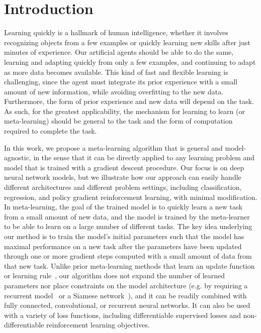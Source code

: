 \documentclass{article}
\begin{document}
\section{Introduction}
\label{sec:intro}


Learning quickly is a hallmark of human intelligence, whether it involves recognizing objects from a few examples or quickly learning new skills
after just minutes of experience. Our artificial agents should be able to do the same, learning and adapting quickly from only a few examples, and continuing to adapt as more data becomes available. This kind of fast and flexible learning is challenging, since the agent must integrate its prior experience with a small amount of new information, while avoiding overfitting to the new data. Furthermore, the form of prior experience and new data will depend on the task. As such, for the greatest applicability, the mechanism for learning to learn (or meta-learning) should be general to the task and the form of computation required to complete the task.

In this work, we propose a meta-learning algorithm that is general and model-agnostic, in the sense that it can be directly applied to any learning problem and model that is trained with a gradient descent procedure. Our focus is on deep neural network models, but we illustrate how our approach can easily handle different architectures and different problem settings, including classification, regression, and policy gradient reinforcement learning, with minimal modification.
In meta-learning, the goal of the trained model is to quickly learn a new task from a small amount of new data, and the model is
trained by the meta-learner to be able to learn on a large number of different tasks.
The key idea underlying our method is to
train the model's initial parameters such that the model has maximal performance on a new task after the parameters have been updated
through one or more gradient steps computed with a small amount of data from that new task.
Unlike prior meta-learning methods that learn an update function or learning rule~\cite{schmidhuber1987,bengiobengio1,learntolearnbygdbygd,hugo}, our algorithm does not expand the number of learned parameters nor place constraints on the model architecture (e.g. by requiring a recurrent model~\cite{mann} or a Siamese network~\cite{siameseoneshot}), and it can be readily combined with fully connected, convolutional, or recurrent neural networks. It can also be used with a variety of loss functions, including differentiable supervised losses and non-differentiable reinforcement learning objectives. %
\end{document}
